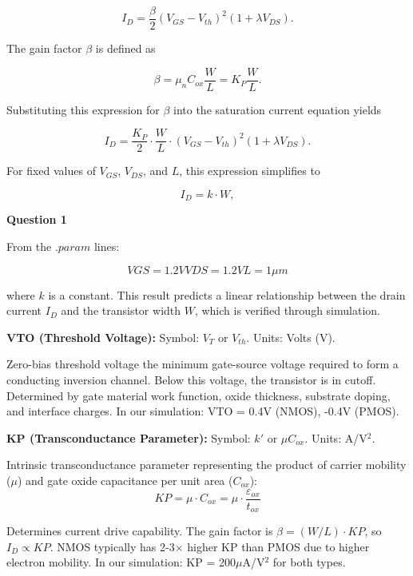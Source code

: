\documentclass[a4paper,12pt]{article}
\begin{document}
\begin{equation}
I_D = \frac{\beta}{2}(V_{GS} - V_{th})^2(1 + \lambda V_{DS}).
\end{equation}

The gain factor $\beta$ is defined as

\begin{equation}
\beta = \mu_n C_{ox} \frac{W}{L} = K_P \frac{W}{L}.
\end{equation}

Substituting this expression for $\beta$ into the saturation current equation yields

\begin{equation}
I_D = \frac{K_P}{2} \cdot \frac{W}{L} \cdot (V_{GS} - V_{th})^2(1 + \lambda V_{DS}).
\end{equation}

For fixed values of $V_{GS}$, $V_{DS}$, and $L$, this expression simplifies to

\begin{equation}
I_D = k \cdot W,
\end{equation}

\textbf{Question 1}

From the $.param$ lines:

\[
VGS = 1.2 V
VDS = 1.2 V
L = 1 \mu m
\]

where $k$ is a constant. This result predicts a linear relationship between the drain current $I_D$ and the transistor width $W$, which is verified through simulation.

\textbf{VTO (Threshold Voltage):}
Symbol: $V_T$ or $V_{th}$. Units: Volts (V).

Zero-bias threshold voltage \- the minimum gate-source voltage required to form a conducting inversion channel. Below this voltage, the transistor is in cutoff. Determined by gate material work function, oxide thickness, substrate doping, and interface charges. In our simulation: VTO = 0.4V (NMOS), -0.4V (PMOS).

\textbf{KP (Transconductance Parameter):}
Symbol: $k'$ or $\mu C_{ox}$. Units: A/V$^2$.

Intrinsic transconductance parameter representing the product of carrier mobility ($\mu$) and gate oxide capacitance per unit area ($C_{ox}$):
\begin{equation}
KP = \mu \cdot C_{ox} = \mu \cdot \frac{\varepsilon_{ox}}{t_{ox}}
\end{equation}

Determines current drive capability. The gain factor is $\beta = (W/L) \cdot KP$, so $I_D \propto KP$. NMOS typically has 2-3$\times$ higher KP than PMOS due to higher electron mobility. In our simulation: KP = 200$\mu$A/V$^2$ for both types.
\end{document}
